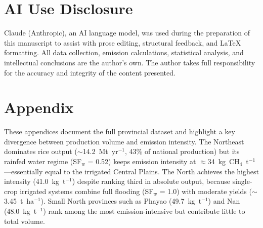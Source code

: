 \documentclass[fleqn,10pt]{olplainarticle}
\begin{document}
\section*{AI Use Disclosure}

Claude (Anthropic), an AI language model, was used during the preparation of
this manuscript to assist with prose editing, structural feedback, and LaTeX
formatting.
All data collection, emission calculations, statistical analysis, and
intellectual conclusions are the author's own.
The author takes full responsibility for the accuracy and integrity of the
content presented.

\section*{Appendix}

\noindent
These appendices document the full provincial dataset and highlight a key divergence
between production volume and emission intensity.
The Northeast dominates rice output ($\sim$14.2~Mt~yr$^{-1}$, 43\% of national production)
but its rainfed water regime (SF$_w$ = 0.52) keeps emission intensity at
$\approx$34~kg~CH$_4$~t$^{-1}$---essentially equal to the irrigated Central Plains.
The North achieves the highest intensity (41.0~kg~t$^{-1}$) despite ranking
third in absolute output, because single-crop irrigated systems combine full
flooding (SF$_w$ = 1.0) with moderate yields ($\sim$3.45~t~ha$^{-1}$).
Small North provinces such as Phayao (49.7~kg~t$^{-1}$) and Nan
(48.0~kg~t$^{-1}$) rank among the most emission-intensive but contribute little
to total volume.
\end{document}
